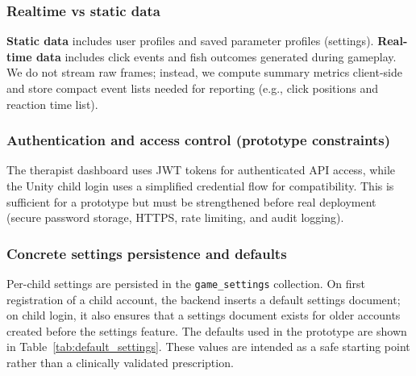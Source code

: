 \documentclass[12pt]{article}
\begin{document}
\subsubsection*{Realtime vs static data}
\textbf{Static data} includes user profiles and saved parameter profiles (settings). \textbf{Real-time data} includes click events and fish outcomes generated during gameplay. We do not stream raw frames; instead, we compute summary metrics client-side and store compact event lists needed for reporting (e.g., click positions and reaction time list).

\subsubsection*{Authentication and access control (prototype constraints)}
The therapist dashboard uses JWT tokens for authenticated API access, while the Unity child login uses a simplified credential flow for compatibility. This is sufficient for a prototype but must be strengthened before real deployment (secure password storage, HTTPS, rate limiting, and audit logging).

\subsubsection*{Concrete settings persistence and defaults}
Per-child settings are persisted in the \texttt{game\_settings} collection. On first registration of a child account, the backend inserts a default settings document; on child login, it also ensures that a settings document exists for older accounts created before the settings feature. The defaults used in the prototype are shown in Table~\ref{tab:default_settings}. These values are intended as a safe starting point rather than a clinically validated prescription.
\end{document}
